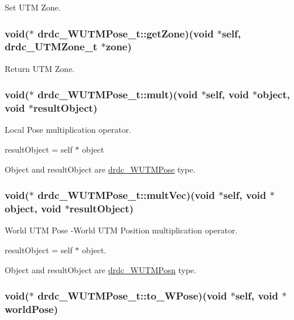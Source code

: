 Set UTM Zone. 

\hypertarget{structdrdc__WUTMPose__t_5834f1f0fff3d88d7adc68ec6d672be8}{
\subsubsection[getZone]{\setlength{\rightskip}{0pt plus 5cm}void($\ast$ {\bf drdc\_\-WUTMPose\_\-t::getZone})(void $\ast$self, {\bf drdc\_\-UTMZone\_\-t} $\ast${\bf zone})}}
\label{structdrdc__WUTMPose__t_5834f1f0fff3d88d7adc68ec6d672be8}


Return UTM Zone. 

\hypertarget{structdrdc__WUTMPose__t_fda321bcdefbdfe5ccaa22d1559c881a}{
\subsubsection[mult]{\setlength{\rightskip}{0pt plus 5cm}void($\ast$ {\bf drdc\_\-WUTMPose\_\-t::mult})(void $\ast$self, void $\ast$object, void $\ast$resultObject)}}
\label{structdrdc__WUTMPose__t_fda321bcdefbdfe5ccaa22d1559c881a}


Local Pose multiplication operator. 

resultObject = self $\ast$ object

Object and resultObject are \hyperlink{classdrdc__WUTMPose}{drdc\_\-WUTMPose} type. \hypertarget{structdrdc__WUTMPose__t_bcb964a242740df7a4c6dfe56a699d77}{
\subsubsection[multVec]{\setlength{\rightskip}{0pt plus 5cm}void($\ast$ {\bf drdc\_\-WUTMPose\_\-t::multVec})(void $\ast$self, void $\ast$object, void $\ast$resultObject)}}
\label{structdrdc__WUTMPose__t_bcb964a242740df7a4c6dfe56a699d77}


World UTM Pose -World UTM Position multiplication operator. 

resultObject = self $\ast$ object.

Object and resultObject are \hyperlink{classdrdc__WUTMPosn}{drdc\_\-WUTMPosn} type. \hypertarget{structdrdc__WUTMPose__t_7fa7adff22c3abf23af792371033c05a}{
\subsubsection[to\_\-WPose]{\setlength{\rightskip}{0pt plus 5cm}void($\ast$ {\bf drdc\_\-WUTMPose\_\-t::to\_\-WPose})(void $\ast$self, void $\ast$worldPose)}}
\label{structdrdc__WUTMPose__t_7fa7adff22c3abf23af792371033c05a}


